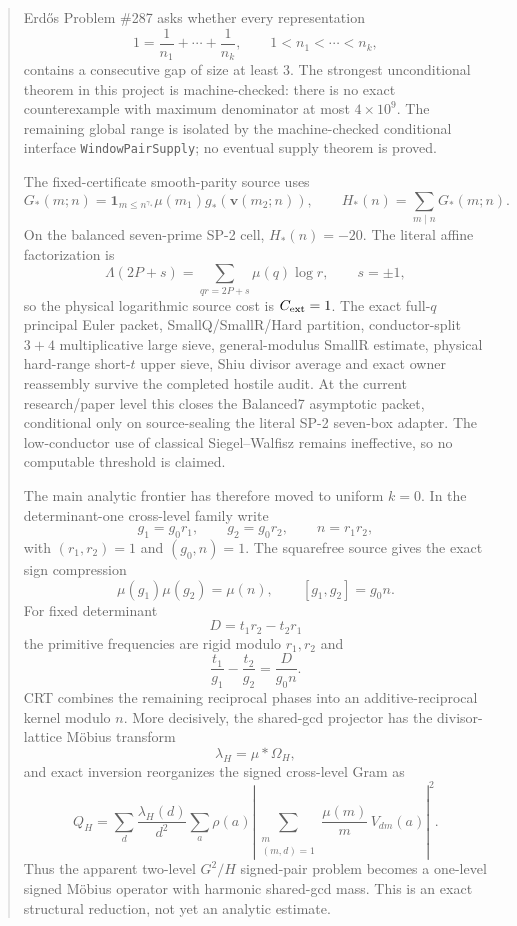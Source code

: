 \documentclass[11pt]{article}
\theoremstyle{definition}
\newcommand{\1}{\mathbf 1}
\begin{document}
\begin{abstract}
Erd\H{o}s Problem \#287 asks whether every representation
\[
1=\frac1{n_1}+\cdots+\frac1{n_k},\qquad 1<n_1<\cdots<n_k,
\]
contains a consecutive gap of size at least $3$.  The strongest unconditional theorem in
this project is machine-checked: there is no exact counterexample with maximum denominator
at most $4\times10^9$.  The remaining global range is isolated by the machine-checked
conditional interface \texttt{WindowPairSupply}; no eventual supply theorem is proved.

The fixed-certificate smooth-parity source uses
\[
G_*(m;n)=\mathbf1_{m\le n^{\gamma_*}}\mu(m_1)g_*(\mathbf v(m_2;n)),
\qquad
H_*(n)=\sum_{m\mid n}G_*(m;n).
\]
On the balanced seven-prime SP-2 cell, $H_*(n)=-20$.  The literal affine factorization is
\[
\Lambda(2P+s)=\sum_{qr=2P+s}\mu(q)\log r,
\qquad s=\pm1,
\]
so the physical logarithmic source cost is $C_{\rm ext}=1$.  The exact full-$q$ principal
Euler packet, SmallQ/SmallR/Hard partition, conductor-split $3+4$ multiplicative large
sieve, general-modulus SmallR estimate, physical hard-range short-$t$ upper sieve, Shiu
divisor average and exact owner reassembly survive the completed hostile audit.  At the
current research/paper level this closes the Balanced7 asymptotic packet, conditional only
on source-sealing the literal SP-2 seven-box adapter.  The low-conductor use of classical
Siegel--Walfisz remains ineffective, so no computable threshold is claimed.

The main analytic frontier has therefore moved to uniform $k=0$.  In the determinant-one
cross-level family write
\[
g_1=g_0r_1,\qquad g_2=g_0r_2,\qquad n=r_1r_2,
\]
with $(r_1,r_2)=1$ and $(g_0,n)=1$.  The squarefree source gives the exact sign compression
\[
\mu(g_1)\mu(g_2)=\mu(n),\qquad [g_1,g_2]=g_0n.
\]
For fixed determinant
\[
D=t_1r_2-t_2r_1
\]
the primitive frequencies are rigid modulo $r_1,r_2$ and
\[
\frac{t_1}{g_1}-\frac{t_2}{g_2}=\frac{D}{g_0n}.
\]
CRT combines the remaining reciprocal phases into an additive-reciprocal kernel modulo
$n$.  More decisively, the shared-gcd projector has the divisor-lattice M\"obius transform
\[
\lambda_H=\mu*\Omega_H,
\]
and exact inversion reorganizes the signed cross-level Gram as
\[
Q_H=
\sum_d\frac{\lambda_H(d)}{d^2}
\sum_a\rho(a)
\left|
\sum_{\substack{m\\(m,d)=1}}
\frac{\mu(m)}m\,V_{dm}(a)
\right|^2 .
\]
Thus the apparent two-level $G^2/H$ signed-pair problem becomes a one-level signed M\"obius
operator with harmonic shared-gcd mass.  This is an exact structural reduction, not yet an
analytic estimate.


\end{abstract}
\end{document}
